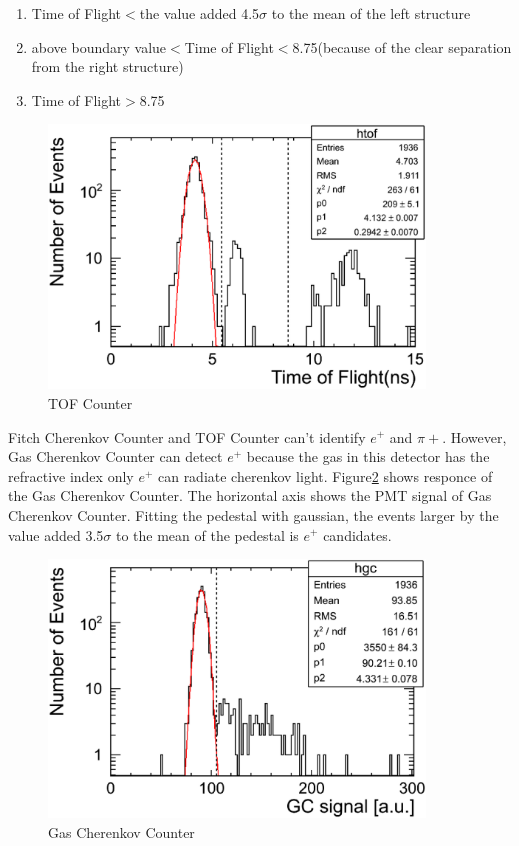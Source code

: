 \begin{enumerate}
\item Time of Flight$<$the value added 4.5$\sigma$ to the mean of the left structure \\
\item above boundary value$<$Time of Flight$<$8.75(because of the clear separation from the right structure) \\
\item Time of Flight$>$8.75 \\
\end{enumerate}

\begin{figure}[htbp]
  \centering
  \includegraphics[width=10cm,clip]{fig/TOF.eps}
  \caption{TOF Counter}
  \label{fig:TOF}
\end{figure}

Fitch Cherenkov Counter and TOF Counter can't identify $e^{+}$ and $\pi{+}$.
However, Gas Cherenkov Counter can detect $e^{+}$ because the gas in this detector has the refractive index
only $e^{+}$ can radiate cherenkov light.
Figure\ref{fig:GC} shows responce of the Gas Cherenkov Counter.
The horizontal axis shows the PMT signal of Gas Cherenkov Counter.
Fitting the pedestal with gaussian,
the events larger by the value added 3.5$\sigma$ to the mean of the pedestal is $e^{+}$ candidates.\\

\begin{figure}[htbp]
  \centering
  \includegraphics[width=10cm,clip]{fig/GC.eps}
  \caption{Gas Cherenkov Counter}
  \label{fig:GC}
\end{figure}

